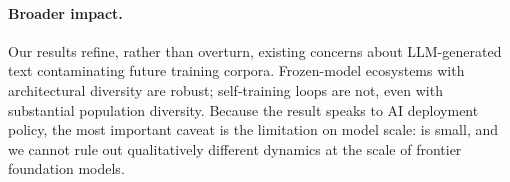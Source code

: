 \paragraph{Broader impact.}
Our results refine, rather than overturn, existing concerns about
LLM-generated text contaminating future training corpora. Frozen-model
ecosystems with architectural diversity are robust; self-training
loops are not, even with substantial population diversity. Because
the result speaks to AI deployment policy, the most important caveat
is the limitation on model scale: \distilgpt is small, and we cannot
rule out qualitatively different dynamics at the scale of frontier
foundation models.
